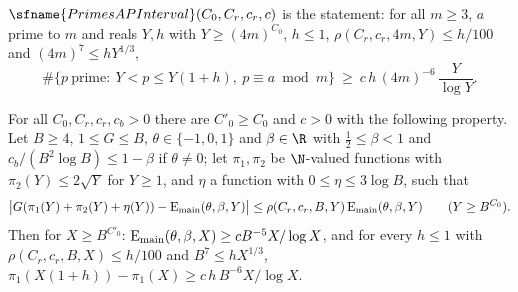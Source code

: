 $\sfname{PrimesAPInterval}(C_0,C_r,c_r,c)$ is the statement: for all $m\ge3$, $a$ prime to $m$ and reals $Y,h$ with
$Y\ge(4m)^{C_0}$, $h\le1$, $\rho(C_r,c_r,4m,Y)\le h/100$ and $(4m)^7\le hY^{1/3}$,
\begin{equation}\label{eq:pf:sh-div:apinterval}
\#\{p\ \text{prime}:\ Y<p\le Y(1+h),\ p\equiv a\bmod m\}\ \ge\ c\,h\,(4m)^{-6}\,\frac{Y}{\log Y}.
\end{equation}

\begin{lemma}\label{pf:sh-div:shortint}
For all $C_0,C_r,c_r,c_b>0$ there are $C'_0\ge C_0$ and $c>0$ with the following property. Let $B\ge4$, $1\le G\le B$,
$\theta\in\{-1,0,1\}$ and $\beta\in\R$ with $\frac12\le\beta<1$ and $c_b/(B^2\log B)\le1-\beta$ if $\theta\ne0$; let $\pi_1,\pi_2$ be
$\N$-valued functions with $\pi_2(Y)\le2\sqrt Y$ for $Y\ge1$, and $\eta$ a function with $0\le\eta\le3\log B$, such that
\begin{equation}\label{eq:pf:sh-div:relasym}
\bigl|G(\pi_1(Y)+\pi_2(Y)+\eta(Y))-\mathrm{E}_{\mathrm{main}}(\theta,\beta,Y)\bigr|\le\rho(C_r,c_r,B,Y)\,\mathrm{E}_{\mathrm{main}}(\theta,\beta,Y)\qquad(Y\ge B^{C_0}).
\end{equation}
Then for $X\ge B^{C'_0}$: $\mathrm{E}_{\mathrm{main}}(\theta,\beta,X)\ge cB^{-5}X/\log X$, and for every $h\le1$ with $\rho(C_r,c_r,B,X)\le h/100$ and
$B^7\le hX^{1/3}$, $\pi_1(X(1+h))-\pi_1(X)\ge c\,h\,B^{-6}X/\log X$.
\end{lemma}

